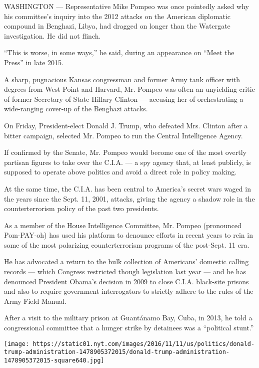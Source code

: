 WASHINGTON --- Representative Mike Pompeo was once pointedly asked why
his committee's inquiry into the 2012 attacks on the American diplomatic
compound in Benghazi, Libya, had dragged on longer than the Watergate
investigation. He did not flinch.

``This is worse, in some ways,'' he said, during an appearance on ``Meet
the Press'' in late 2015.

A sharp, pugnacious Kansas congressman and former Army tank officer with
degrees from West Point and Harvard, Mr. Pompeo was often an unyielding
critic of former Secretary of State Hillary Clinton --- accusing her of
orchestrating a wide-ranging cover-up of the Benghazi attacks.

On Friday, President-elect Donald J. Trump, who defeated Mrs. Clinton
after a bitter campaign, selected Mr. Pompeo to run the Central
Intelligence Agency.

If confirmed by the Senate, Mr. Pompeo would become one of the most
overtly partisan figures to take over the C.I.A. --- a spy agency that,
at least publicly, is supposed to operate above politics and avoid a
direct role in policy making.

At the same time, the C.I.A. has been central to America's secret wars
waged in the years since the Sept. 11, 2001, attacks, giving the agency
a shadow role in the counterterrorism policy of the past two presidents.

As a member of the House Intelligence Committee, Mr. Pompeo (pronounced
Pom-PAY-oh) has used his platform to denounce efforts in recent years to
rein in some of the most polarizing counterterrorism programs of the
post-Sept. 11 era.

He has advocated a return to the bulk collection of Americans' domestic
calling records --- which Congress restricted though legislation last
year --- and he has denounced President Obama's decision in 2009 to
close C.I.A. black-site prisons and also to require government
interrogators to strictly adhere to the rules of the Army Field Manual.

After a visit to the military prison at Guantánamo Bay, Cuba, in 2013,
he told a congressional committee that a hunger strike by detainees was
a ``political stunt.''

\href{https://www.nytimes.com/interactive/2016/us/politics/donald-trump-administration.html}{}

\texttt{[image: https://static01.nyt.com/images/2016/11/11/us/politics/donald-trump-administration-1478905372015/donald-trump-administration-1478905372015-square640.jpg]}

